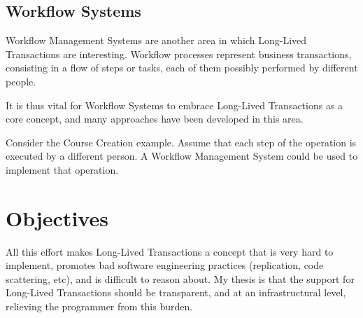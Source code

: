 \subsection{Workflow Systems}

Workflow Management Systems are another area in which Long-Lived
Transactions are interesting. Workflow processes represent business
transactions, consisting in a flow of steps or tasks, each of them
possibly performed by different people.

It is thus vital for Workflow Systems to embrace Long-Lived
Transactions as a core concept, and many approaches have been
developed in this area.

Consider the Course Creation example. Assume that each step of the
operation is executed by a different person. A Workflow Management
System could be used to implement that operation.

\section{Objectives}

All this effort makes Long-Lived Transactions a concept that is very
hard to implement, promotes bad software engineering practices
(replication, code scattering, etc), and is difficult to reason
about. My thesis is that the support for Long-Lived Transactions
should be transparent, and at an infrastructural level, relieving the
programmer from this burden.
